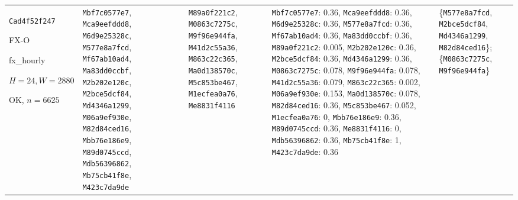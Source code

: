 \begin{longtable}{p{.15\linewidth}p{.17\linewidth}p{.17\linewidth}p{.25\linewidth}p{.14\linewidth}}
\texttt{Cad4f52f247}\par FX-O\par fx\_\allowbreak{}hourly\par $H=24,W=2880$\par OK, $n=6625$ & \texttt{Mbf7c0577e7}, \texttt{Mca9eefddd8}, \texttt{M6d9e25328c}, \texttt{M577e8a7fcd}, \texttt{Mf67ab10ad4}, \texttt{Ma83dd0ccbf}, \texttt{M2b202e120c}, \texttt{M2bce5dcf84}, \texttt{Md4346a1299}, \texttt{M06a9ef930e}, \texttt{M82d84ced16}, \texttt{Mbb76e186e9}, \texttt{M89d0745ccd}, \texttt{Mdb56396862}, \texttt{Mb75cb41f8e}, \texttt{M423c7da9de} & \texttt{M89a0f221c2}, \texttt{M0863c7275c}, \texttt{M9f96e944fa}, \texttt{M41d2c55a36}, \texttt{M863c22c365}, \texttt{Ma0d138570c}, \texttt{M5c853be467}, \texttt{M1ecfea0a76}, \texttt{Me8831f4116} & \texttt{Mbf7c0577e7}: 0.36, \texttt{Mca9eefddd8}: 0.36, \texttt{M6d9e25328c}: 0.36, \texttt{M577e8a7fcd}: 0.36, \texttt{Mf67ab10ad4}: 0.36, \texttt{Ma83dd0ccbf}: 0.36, \texttt{M89a0f221c2}: 0.005, \texttt{M2b202e120c}: 0.36, \texttt{M2bce5dcf84}: 0.36, \texttt{Md4346a1299}: 0.36, \texttt{M0863c7275c}: 0.078, \texttt{M9f96e944fa}: 0.078, \texttt{M41d2c55a36}: 0.079, \texttt{M863c22c365}: 0.002, \texttt{M06a9ef930e}: 0.153, \texttt{Ma0d138570c}: 0.078, \texttt{M82d84ced16}: 0.36, \texttt{M5c853be467}: 0.052, \texttt{M1ecfea0a76}: 0, \texttt{Mbb76e186e9}: 0.36, \texttt{M89d0745ccd}: 0.36, \texttt{Me8831f4116}: 0, \texttt{Mdb56396862}: 0.36, \texttt{Mb75cb41f8e}: 1, \texttt{M423c7da9de}: 0.36 & \{\texttt{M577e8a7fcd}, \texttt{M2bce5dcf84}, \texttt{Md4346a1299}, \texttt{M82d84ced16}\}; \{\texttt{M0863c7275c}, \texttt{M9f96e944fa}\} \\

\end{longtable}
